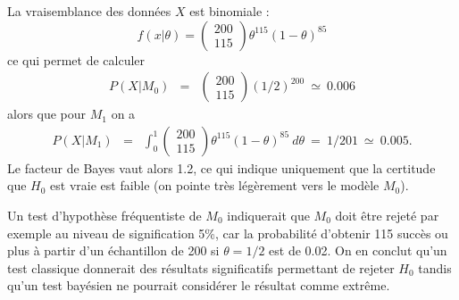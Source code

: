 \begin{rep}%
La vraisemblance des données $X$ est binomiale :
$$
f(x|\theta) = \left(\begin{array}{l} 200 \\ 115 \end{array}\right) \theta^{115}(1-\theta)^{85}
$$
ce qui permet de calculer
\begin{eqnarray*}
P(X|M_0) & = & \left(\begin{array}{l} 200 \\ 115 \end{array}\right) (1/2)^{200} \ \simeq \ 0.006
\end{eqnarray*}
alors que pour $M_1$ on a
\begin{eqnarray*}
P(X|M_1) & = & \int_0^1 \left(\begin{array}{l} 200 \\ 115 \end{array}\right) \theta^{115}(1-\theta)^{85} \ d\theta \ = \ 1/201 \ \simeq \ 0.005.
\end{eqnarray*}
Le facteur de Bayes vaut alors 1.2, ce qui indique uniquement que la certitude que $H_0$ est vraie est faible (on pointe très légèrement vers le modèle $M_0$). 

Un test d'hypothèse fréquentiste de $M_0$ indiquerait que $M_0$ doit être rejeté par exemple au niveau de signification 5\%, car la probabilité d'obtenir 115 succès ou plus à partir d'un échantillon de 200 si $\theta=1/2$ est de 0.02. On en conclut qu'un test classique donnerait des résultats significatifs permettant de rejeter $H_0$ tandis qu'un test bayésien ne pourrait considérer le résultat comme extrême.

\end{rep}